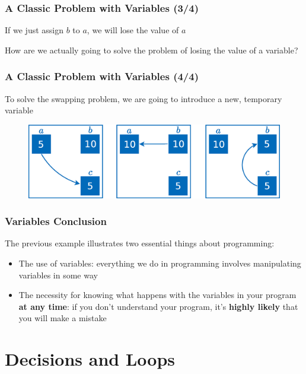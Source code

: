 \documentclass{beamer}
\begin{document}
\begin{frame}
\frametitle{A Classic Problem with Variables (3/4)}
    If we just assign $b$ to $a$, we will lose the value of $a$
    \newline

    How are we actually going to solve the problem of losing the value of a variable?
\end{frame}

\begin{frame}
\frametitle{A Classic Problem with Variables (4/4)}
    To solve the swapping problem, we are going to introduce a new, temporary variable
    \begin{figure}[H]
        \centering
        \includegraphics[scale=0.3]{figures/two_variables_example/swapping.eps}
    \end{figure}
\end{frame}

\begin{frame}
\frametitle{Variables Conclusion}
    The previous example illustrates two essential things about programming:
    \begin{itemize}
        \item The use of variables: everything we do in programming involves manipulating variables in some way
        \item The necessity for knowing what happens with the variables in your program \textbf{at any time}: if you don’t understand your program, it's \textbf{highly likely} that you will make a mistake
    \end{itemize}
\end{frame}

\section{Decisions and Loops}
\end{document}
